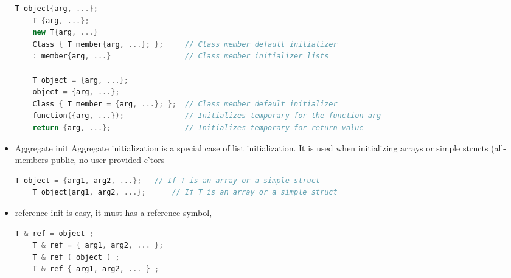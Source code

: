 \documentclass[a4paper,12pt,twoside]{book}
\begin{document}
\begin{itemize}
\begin{lstlisting}[frame=single, language=c++]
	T object{arg, ...};
	T {arg, ...};
	new T{arg, ...}
	Class { T member{arg, ...}; };     // Class member default initializer
	: member{arg, ...}                 // Class member initializer lists
	
	T object = {arg, ...};
	object = {arg, ...};
	Class { T member = {arg, ...}; };  // Class member default initializer
	function({arg, ...});              // Initializes temporary for the function arg
	return {arg, ...};                 // Initializes temporary for return value
	\end{lstlisting}
	
	\item Aggregate init Aggregate initialization is a special case of list initialization. It is used when initializing arrays or simple structs (all-members-public, no user-provided c'tors
	\begin{lstlisting}[frame=single, language=c++]
	T object = {arg1, arg2, ...};   // If T is an array or a simple struct
	T object{arg1, arg2, ...};      // If T is an array or a simple struct
	\end{lstlisting}
	
	\item reference init is easy, it must has a reference symbol, 
	\begin{lstlisting}[frame=single, language=c++]
	T & ref = object ;
	T & ref = { arg1, arg2, ... };
	T & ref ( object ) ;
	T & ref { arg1, arg2, ... } ;
	\end{lstlisting}
	
\end{itemize}
\end{document}
